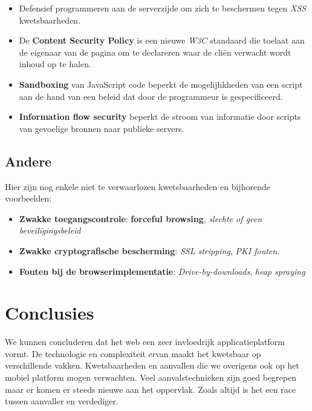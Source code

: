 \documentclass[../main.tex]{subfiles}
\begin{document}
\begin{itemize}
	\item Defensief programmeren aan de serverzijde om zich te beschermen tegen \textit{XSS} kwetsbaarheden.
	\item  De \textbf{Content Security Policy} is een nieuwe \textit{W3C} standaard die toelaat aan de eigenaar van de pagina om te declareren waar de cli\"en verwacht wordt inhoud op te halen. 
	\item \textbf{Sandboxing} van JavaScript code beperkt de mogelijhkheden van een script aan de hand van een beleid dat door de programmeur is gespecificeerd.
	\item \textbf{Information flow security} beperkt de stroom van informatie door scripts van gevoelige bronnen naar publieke servers.
\end{itemize}

\subsection{Andere}
Hier zijn nog enkele niet te verwaarlozen kwetsbaarheden en bijhorende voorbeelden:
\begin{itemize}
	\item \textbf{Zwakke toegangscontrole}: \textbf{forceful browsing}, \textit{slechte of geen beveiligingsbeleid}
	\item \textbf{Zwakke cryptografische bescherming}: \textit{SSL stripping}, \textit{PKI fouten}.
	\item \textbf{Fouten bij de browserimplementatie}: \textit{Drive-by-downloads}, \textit{heap spraying}
\end{itemize}

\section{Conclusies}
We kunnen concluderen dat het web een zeer invloedrijk applicatieplatform vormt. De technologie en complexiteit ervan maakt het kwetsbaar op verschillende vakken. Kwetsbaarheden en aanvallen die we overigens ook op het mobiel platform mogen verwachten. Veel aanvalstechnieken zijn goed begrepen maar er komen er steeds nieuwe aan het oppervlak. Zoals altijd is het een race tussen aanvaller en verdediger.
\end{document}

